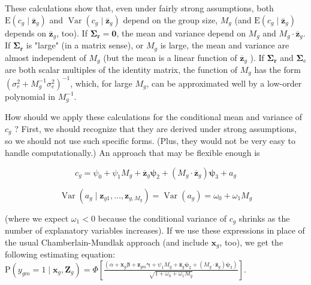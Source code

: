 \documentclass[10pt]{article}
\begin{document}
These calculations show that, even under fairly strong assumptions, both $\mathrm{E}\left(c_{g} \mid \overline{\mathbf{z}}_{g}\right)$ and $\operatorname{Var}\left(c_{g} \mid \overline{\mathbf{z}}_{g}\right)$ depend on the group size, $M_{g}$ (and $\mathrm{E}\left(c_{g} \mid \overline{\mathbf{z}}_{g}\right)$ depends on $\overline{\mathbf{z}}_{g}$, too). If $\boldsymbol{\Sigma}_{\mathbf{r}}=\mathbf{0}$, the mean and variance depend on $M_{g}$ and $M_{g} \cdot \overline{\mathbf{z}}_{g}$. If $\boldsymbol{\Sigma}_{\mathbf{r}}$ is "large" (in a matrix sense), or $M_{g}$ is large, the mean and variance are almost independent of $M_{g}$ (but the mean is a linear function of $\overline{\mathbf{z}}_{g}$ ). If $\boldsymbol{\Sigma}_{\mathbf{r}}$ and $\boldsymbol{\Sigma}_{\mathrm{e}}$ are both scalar multiples of the identity matrix, the function of $M_{g}$ has the form $\left(\sigma_{r}^{2}+M_{g}^{-1} \sigma_{e}^{2}\right)^{-1}$, which, for large $M_{g}$, can be approximated well by a low-order polynomial in $M_{g}^{-1}$.

How should we apply these calculations for the conditional mean and variance of $c_{g}$ ? First, we should recognize that they are derived under strong assumptions, so we should not use such specific forms. (Plus, they would not be very easy to handle computationally.) An approach that may be flexible enough is


\begin{equation*}
c_{g}=\psi_{0}+\psi_{1} M_{g}+\overline{\mathbf{z}}_{g} \boldsymbol{\psi}_{2}+\left(M_{g} \cdot \overline{\mathbf{z}}_{g}\right) \boldsymbol{\psi}_{3}+a_{g} \tag{20.44}
\end{equation*}



\begin{equation*}
\operatorname{Var}\left(a_{g} \mid \mathbf{z}_{g 1}, \ldots, \mathbf{z}_{g, M_{g}}\right)=\operatorname{Var}\left(a_{g}\right)=\omega_{0}+\omega_{1} M_{g} \tag{20.45}
\end{equation*}


(where we expect $\omega_{1}<0$ because the conditional variance of $c_{g}$ shrinks as the number of explanatory variables increases). If we use these expressions in place of the usual Chamberlain-Mundlak approach (and include $\mathbf{x}_{g}$, too), we get the following estimating equation:\\
$\mathrm{P}\left(y_{g m}=1 \mid \mathbf{x}_{g}, \mathbf{Z}_{g}\right)=\Phi\left[\frac{\left(\alpha+\mathbf{x}_{g} \boldsymbol{\beta}+\mathbf{z}_{g m} \boldsymbol{\gamma}+\psi_{1} M_{g}+\overline{\mathbf{z}}_{g} \boldsymbol{\psi}_{2}+\left(M_{g} \cdot \overline{\mathbf{z}}_{g}\right) \boldsymbol{\psi}_{3}\right)}{\sqrt{1+\omega_{0}+\omega_{1} M_{g}}}\right]$.
\end{document}
